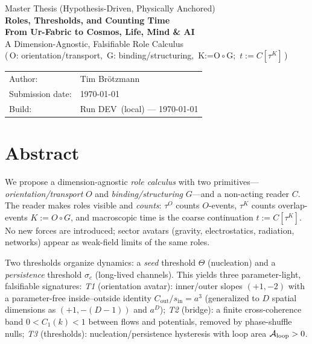 \documentclass[12pt,a4paper,oneside]{scrreprt}
\def\BuildRun{DEV}\def\BuildSHA{local}\def\BuildDate{\today}%
\begin{document}
\begin{titlepage}
  \centering
  {\Large Master Thesis (Hypothesis-Driven, Physically Anchored)}\\[0.6em]
  {\huge\bfseries Roles, Thresholds, and Counting Time}\\[0.25em]
  {\Large\bfseries From Ur-Fabric to Cosmos, Life, Mind \& AI}\\[1.0em]
  {\large A Dimension-Agnostic, Falsifiable Role Calculus}\\[-0.2em]
  {\small (\,O: orientation/transport,\ G: binding/structuring,\ K:=O$\!\circ$G;\ $t:=C[\tau^K]$\,)}\\[2.0em]

  \begin{tabular}{@{}ll@{}}
    Author: & Tim Brötzmann \\
    Submission date: & \today \\
    Build: & Run \BuildRun\ (\BuildSHA) — \BuildDate \\
  \end{tabular}

  \vfill
\end{titlepage}


\chapter*{Abstract}
We propose a dimension-agnostic \emph{role calculus} with two primitives—%
\emph{orientation/transport} $O$ and \emph{binding/structuring} $G$—and a non-acting reader $C$.
The reader makes roles visible and \emph{counts}: $\tau^O$ counts $O$-events, $\tau^K$ counts overlap-events $K:=O\!\circ G$, and macroscopic time is the coarse continuation $t:=C[\tau^K]$.
No new forces are introduced; sector avatars (gravity, electrostatics, radiation, networks) appear as weak-field limits of the same roles.

Two thresholds organize dynamics: a \emph{seed} threshold $\Theta$ (nucleation) and a \emph{persistence} threshold $\sigma_c$ (long-lived channels). This yields three parameter-light, falsifiable signatures:
\emph{T1} (orientation avatar): inner/outer slopes $(+1,-2)$ with a parameter-free inside–outside identity $C_{\mathrm{out}}/s_{\mathrm{in}}=a^3$ (generalized to $D$ spatial dimensions as $(+1,-(D\!-\!1))$ and $a^{D}$);
\emph{T2} (bridge): a finite cross-coherence band $0<C_1(k)<1$ between flows and potentials, removed by phase-shuffle nulls;
\emph{T3} (thresholds): nucleation/persistence hysteresis with loop area $\mathcal A_{\rm loop}>0$.
\end{document}

